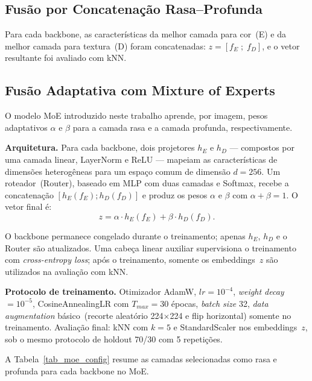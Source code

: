 \documentclass[letterpaper, 10 pt, conference]{ieeeconf}
\begin{document}
\subsection{Fusão por Concatenação Rasa–Profunda}

Para cada backbone, as características da melhor camada para cor~(E) e da
melhor camada para textura~(D) foram concatenadas:
$z = [f_E \; ; \; f_D]$, e o vetor resultante foi avaliado com kNN.

\subsection{Fusão Adaptativa com Mixture of Experts}

O modelo MoE introduzido neste trabalho aprende, por imagem, pesos
adaptativos $\alpha$ e $\beta$ para a camada rasa e a camada profunda,
respectivamente.

\textbf{Arquitetura.} Para cada backbone, dois projetores
$h_E$ e $h_D$ — compostos por uma camada linear, LayerNorm e ReLU —
mapeiam as características de dimensões heterogêneas para um espaço
comum de dimensão $d = 256$.
Um roteador~(Router), baseado em MLP com duas camadas e Softmax, recebe a
concatenação $[h_E(f_E) ; h_D(f_D)]$ e produz os pesos $\alpha$ e $\beta$
com $\alpha + \beta = 1$.
O vetor final é:
\begin{equation}
    z = \alpha \cdot h_E(f_E) + \beta \cdot h_D(f_D).
    \label{eq:moe}
\end{equation}

O backbone permanece congelado durante o treinamento; apenas $h_E$, $h_D$
e o Router são atualizados.
Uma cabeça linear auxiliar supervisiona o treinamento com
\emph{cross-entropy loss}; após o treinamento, somente os embeddings~$z$
são utilizados na avaliação com kNN.

\textbf{Protocolo de treinamento.} Otimizador AdamW, $lr = 10^{-4}$,
\emph{weight decay} $= 10^{-5}$, CosineAnnealingLR com $T_{max} = 30$
épocas, \emph{batch size} 32, \emph{data augmentation} básico~(recorte
aleatório 224$\times$224 e flip horizontal) somente no treinamento.
Avaliação final: kNN com $k = 5$ e StandardScaler nos embeddings~$z$,
sob o mesmo protocolo de holdout 70/30 com 5 repetições.

A Tabela~\ref{tab_moe_config} resume as camadas selecionadas como rasa e
profunda para cada backbone no MoE.
\end{document}
